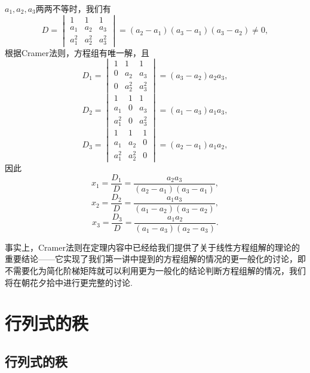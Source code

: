 \begin{solution}
    $a_1,a_2,a_3$两两不等时，我们有
    \[D=\begin{vmatrix}
            1     & 1     & 1     \\
            a_1   & a_2   & a_3   \\
            a_1^2 & a_2^2 & a_3^2
        \end{vmatrix}=(a_2-a_1)(a_3-a_1)(a_3-a_2)\neq 0,\]
    根据Cramer法则，方程组有唯一解，且
    \[D_1=\begin{vmatrix}
            1 & 1     & 1     \\
            0 & a_2   & a_3   \\
            0 & a_2^2 & a_3^2
        \end{vmatrix}=(a_3-a_2)a_2a_3,\]
    \[D_2=\begin{vmatrix}
            1     & 1 & 1     \\
            a_1   & 0 & a_3   \\
            a_1^2 & 0 & a_3^2
        \end{vmatrix}=(a_1-a_3)a_1a_3,\]
    \[D_3=\begin{vmatrix}
            1     & 1     & 1 \\
            a_1   & a_2   & 0 \\
            a_1^2 & a_2^2 & 0
        \end{vmatrix}=(a_2-a_1)a_1a_2,\]
    因此
    \[x_1=\dfrac{D_1}{D}=\dfrac{a_2a_3}{(a_2-a_1)(a_3-a_1)},\]\[x_2=\dfrac{D_2}{D}=\dfrac{a_1a_3}{(a_1-a_2)(a_3-a_2)},\]\[x_3=\dfrac{D_3}{D}=\dfrac{a_1a_2}{(a_1-a_3)(a_2-a_3)}.\]
\end{solution}

事实上，Cramer法则在定理内容中已经给我们提供了关于线性方程组解的理论的重要结论——它实现了我们第一讲中提到的方程组解的情况的更一般化的讨论，即不需要化为简化阶梯矩阵就可以利用更为一般化的结论判断方程组解的情况，我们将在朝花夕拾中进行更完整的讨论.

\section{行列式的秩}

\subsection{行列式的秩}

